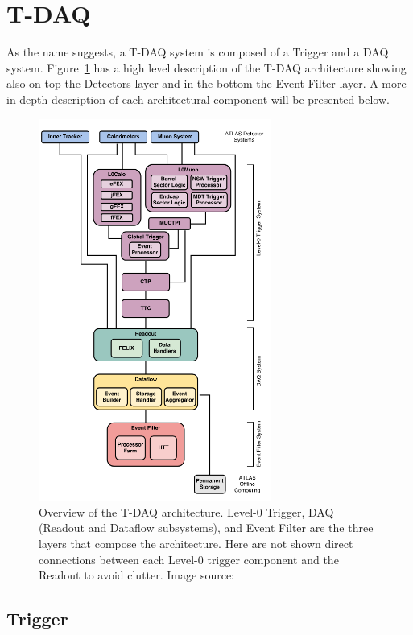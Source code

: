 \clearpage
\section{\acf{T-DAQ}}

As the name suggests, a \acf{T-DAQ} system is composed of a Trigger and a \acf{DAQ} system. Figure~\ref{fig:tdaq} has a high level description of the \acs{T-DAQ} architecture showing also on top the Detectors layer and in the bottom the Event Filter layer. A  more in-depth description of each architectural component will be presented below.

\begin{figure}[htbp]
\centering
\includegraphics[width=0.68\textwidth]{images/introduction/tdaq.png}
\caption{Overview of the \acs{T-DAQ} architecture. Level-0 Trigger, DAQ (Readout and Dataflow subsystems),
and Event Filter are the three layers that compose the architecture. Here are not shown direct connections between each Level-0 trigger component and the Readout to avoid clutter. Image source: \protect\cite{tdaq}}
\label{fig:tdaq}
\end{figure}

\subsection{Trigger}

